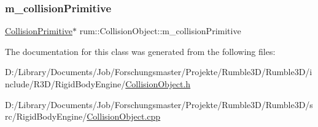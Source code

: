 \subsubsection{\texorpdfstring{m\+\_\+collision\+Primitive}{m\_collisionPrimitive}}
{\footnotesize\ttfamily \mbox{\hyperlink{classrum_1_1_collision_primitive}{Collision\+Primitive}}$\ast$ rum\+::\+Collision\+Object\+::m\+\_\+collision\+Primitive\hspace{0.3cm}{\ttfamily [protected]}}



The documentation for this class was generated from the following files\+:\begin{DoxyCompactItemize}
\item 
D\+:/\+Library/\+Documents/\+Job/\+Forschungsmaster/\+Projekte/\+Rumble3\+D/\+Rumble3\+D/include/\+R3\+D/\+Rigid\+Body\+Engine/\mbox{\hyperlink{_collision_object_8h}{Collision\+Object.\+h}}\item 
D\+:/\+Library/\+Documents/\+Job/\+Forschungsmaster/\+Projekte/\+Rumble3\+D/\+Rumble3\+D/src/\+Rigid\+Body\+Engine/\mbox{\hyperlink{_collision_object_8cpp}{Collision\+Object.\+cpp}}\end{DoxyCompactItemize}
